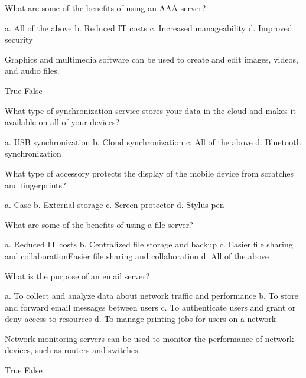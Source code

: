 \documentclass{exam}
\begin{document}
\begin{questions}
\question What are some of the benefits of using an AAA server?
\begin{checkboxes}
\CorrectChoice a. All of the above
\choice b. Reduced IT costs
\choice c. Increased manageability
\choice d. Improved security
\end{checkboxes}

\question Graphics and multimedia software can be used to create and edit images, videos, and audio files.
\begin{checkboxes}
\CorrectChoice True
\choice False
\end{checkboxes}

\question What type of synchronization service stores your data in the cloud and makes it available on all of your devices?
\begin{checkboxes}
\choice a. USB synchronization
\CorrectChoice b. Cloud synchronization
\choice c. All of the above
\choice d. Bluetooth synchronization
\end{checkboxes}

\question What type of accessory protects the display of the mobile device from scratches and fingerprints?
\begin{checkboxes}
\choice a. Case
\choice b. External storage
\CorrectChoice c. Screen protector
\choice d. Stylus pen
\end{checkboxes}

\question What are some of the benefits of using a file server?
\begin{checkboxes}
\choice a. Reduced IT costs
\choice b. Centralized file storage and backup
\choice c. Easier file sharing and collaborationEasier file sharing and collaboration
\CorrectChoice d. All of the above
\end{checkboxes}

\question What is the purpose of an email server?
\begin{checkboxes}
\choice a. To collect and analyze data about network traffic and performance
\CorrectChoice b. To store and forward email messages between users
\choice c. To authenticate users and grant or deny access to resources
\choice d. To manage printing jobs for users on a network
\end{checkboxes}

\question Network monitoring servers can be used to monitor the performance of network devices, such as routers and switches.
\begin{checkboxes}
\CorrectChoice True
\choice False
\end{checkboxes}


\end{questions}
\end{document}

